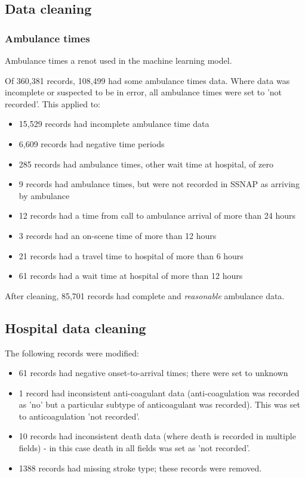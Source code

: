 \subsection{Data cleaning}

\subsubsection{Ambulance times}

Ambulance times a renot used in the machine learning model.

Of 360,381 records, 108,499 had some ambulance times data. Where data was incomplete or suspected to be in error, all ambulance times were set to 'not recorded'. This applied to:

\begin{itemize}
    \item 15,529 records had incomplete ambulance time data
    \item 6,609 records had negative time periods
    \item 285 records had ambulance times, other wait time at hospital, of zero
    \item 9 records had ambulance times, but were not recorded in SSNAP as arriving by ambulance
    \item 12 records had a time from call to ambulance arrival of more than 24 hours
    \item 3 records had an on-scene time of more than 12 hours
    \item 21 records had a travel time to hospital of more than 6 hours
    \item 61 records had a wait time at hospital of more than 12 hours 
\end{itemize}

After cleaning, 85,701 records had complete and \textit{reasonable} ambulance data.

\subsection{Hospital data cleaning}

The following records were modified:

\begin{itemize}
    \item 61 records had negative onset-to-arrival times; there were set to unknown
    \item 1 record had inconsistent anti-coagulant data (anti-coagulation was recorded as 'no' but a particular subtype of anticoagulant was recorded). This was set to anticoagulation 'not recorded'.
    \item 10 records had inconsistent death data (where death is recorded in multiple fields) - in this case death in all fields was set as 'not recorded'.
    \item 1388 records had missing stroke type; these records were removed.
\end{itemize}

